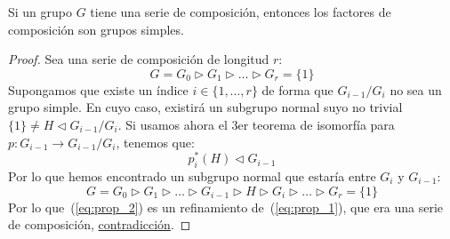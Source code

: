 \begin{prop}
    Si un grupo $G$ tiene una serie de composición, entonces los factores de composición son grupos simples.
    \begin{proof}
        Sea una serie de composición de longitud $r$:
        \begin{equation}\label{eq:prop_1}
            G=G_0 \rhd G_1 \rhd \ldots \rhd G_r = \{1\}
        \end{equation}
        Supongamos que existe un índice $i \in \{1,\ldots,r\}$ de forma que $G_{i-1}/G_i$ no sea un grupo simple. En cuyo caso, existirá un subgrupo normal suyo no trivial $\{1\}\neq H \lhd G_{i-1}/G_i$. Si usamos ahora el 3er teorema de isomorfía para $p:G_{i-1}\to G_{i-1}/G_i$, tenemos que:
        \begin{equation*}
            p_i^\ast(H) \lhd G_{i-1}
        \end{equation*}
        Por lo que hemos encontrado un subgrupo normal que estaría entre $G_i$ y $G_{i-1}$:
        \begin{equation}\label{eq:prop_2}
            G=G_0 \rhd G_1 \rhd \ldots \rhd G_{i-1} \rhd H \rhd G_i \rhd \ldots \rhd G_r = \{1\}
        \end{equation}
        Por lo que~(\ref{eq:prop_2}) es un refinamiento de~(\ref{eq:prop_1}), que era una serie de composición, \underline{contradicción}.
    \end{proof}
\end{prop}

